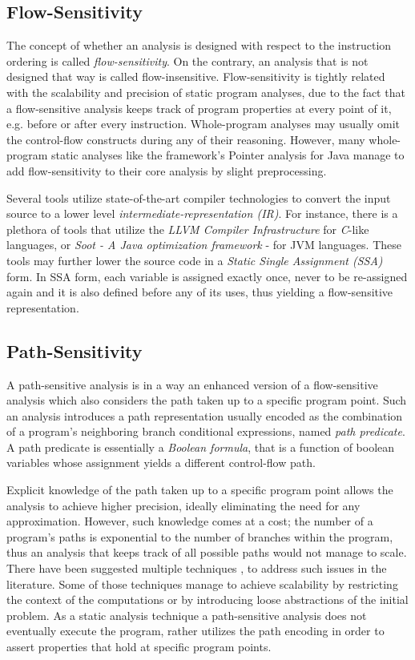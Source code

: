 \subsection{Flow-Sensitivity}

The concept of whether an analysis is designed with respect to
the instruction ordering is called \emph{flow-sensitivity}.
On the contrary, an analysis that is not designed that way is
called flow-insensitive. Flow-sensitivity is tightly related with
the scalability and precision of static program analyses, due to the
fact that a flow-sensitive analysis keeps track of program properties
at every point of it, e.g. before or after every instruction.
Whole-program analyses may usually omit the control-flow constructs
during any of their reasoning. However, many whole-program static
analyses like the \doop{} framework's Pointer analysis for Java
manage to add flow-sensitivity to their core analysis by slight
preprocessing\cite{points-to15}.

Several tools utilize state-of-the-art compiler technologies to
convert the input source to a lower level \emph{intermediate-representation (IR)}.
For instance, there is a plethora of tools that utilize the \emph{LLVM Compiler 
Infrastructure}\cite{llvm-lattner} for \emph{C}-like languages,
or \emph{Soot - A Java optimization framework}\cite{soot} - for JVM languages.
These tools may further lower the source code in a
\emph{Static Single Assignment (SSA)} form. In SSA form, each variable is
assigned exactly once, never to be re-assigned again and it is also defined
before any of its uses, thus yielding a flow-sensitive representation.

\subsection{Path-Sensitivity}

A path-sensitive analysis is in a way an enhanced version of a
flow-sensitive analysis which also considers the path taken up to
a specific program point. Such an analysis
introduces a path representation usually encoded as the combination of
a program's neighboring branch conditional expressions,
named \textit{path predicate}. A path predicate is essentially a
\textit{Boolean formula}, that is a function of boolean variables whose assignment yields a
different control-flow path.

Explicit knowledge of the path taken up to a specific
program point allows the analysis to achieve higher
precision, ideally eliminating the need for any approximation.
However, such knowledge comes at a cost; the number of a program's
paths is exponential to the number of branches within the program,
thus an analysis that keeps track of all possible paths would not
manage to scale. There have been suggested multiple techniques
\cite{dillig2008sound}, \cite{das2002esp} to address such issues
in the literature. Some of those techniques manage to achieve
scalability by restricting the context of the computations or
by introducing loose abstractions of the initial problem.
As a static analysis technique a path-sensitive analysis does not
eventually execute the program, rather utilizes
the path encoding in order to assert properties that hold at
specific program points.

